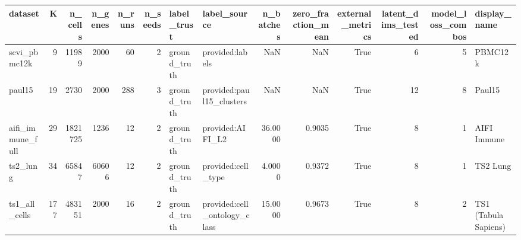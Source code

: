 \begin{tabular}{lrrrrrllrrrrrl}
\toprule
dataset & K & n\_cells & n\_genes & n\_runs & n\_seeds & label\_trust & label\_source & n\_batches & zero\_fraction\_mean & external\_metrics & latent\_dims\_tested & model\_loss\_combos & display\_name \\
\midrule
scvi\_pbmc12k & 9 & 11989 & 2000 & 60 & 2 & ground\_truth & provided:labels & NaN & NaN & True & 6 & 5 & PBMC12k \\
paul15 & 19 & 2730 & 2000 & 288 & 3 & ground\_truth & provided:paul15\_clusters & NaN & NaN & True & 12 & 8 & Paul15 \\
aifi\_immune\_full & 29 & 1821725 & 1236 & 12 & 2 & ground\_truth & provided:AIFI\_L2 & 36.0000 & 0.9035 & True & 8 & 1 & AIFI Immune \\
ts2\_lung & 34 & 65847 & 60606 & 12 & 2 & ground\_truth & provided:cell\_type & 4.0000 & 0.9372 & True & 8 & 1 & TS2 Lung \\
ts1\_all\_cells & 177 & 483151 & 2000 & 16 & 2 & ground\_truth & provided:cell\_ontology\_class & 15.0000 & 0.9673 & True & 8 & 2 & TS1 (Tabula Sapiens) \\
\bottomrule
\end{tabular}
